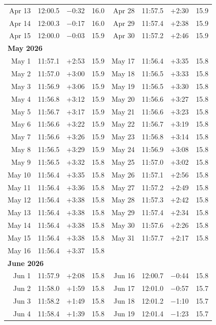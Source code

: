 {\begin{longtable}{r r r r | r r r r}
Apr 13 & 12:00.5 & $-$0:32 & 16.0 & Apr 28 & 11:57.5 & +2:30 & 15.9 \\
Apr 14 & 12:00.3 & $-$0:17 & 16.0 & Apr 29 & 11:57.4 & +2:38 & 15.9 \\
Apr 15 & 12:00.0 & $-$0:03 & 15.9 & Apr 30 & 11:57.2 & +2:46 & 15.9 \\
\multicolumn{8}{l}{\textbf{May 2026}}\\
May 1 & 11:57.1 & +2:53 & 15.9 & May 17 & 11:56.4 & +3:35 & 15.8 \\
May 2 & 11:57.0 & +3:00 & 15.9 & May 18 & 11:56.5 & +3:33 & 15.8 \\
May 3 & 11:56.9 & +3:06 & 15.9 & May 19 & 11:56.5 & +3:30 & 15.8 \\
May 4 & 11:56.8 & +3:12 & 15.9 & May 20 & 11:56.6 & +3:27 & 15.8 \\
May 5 & 11:56.7 & +3:17 & 15.9 & May 21 & 11:56.6 & +3:23 & 15.8 \\
May 6 & 11:56.6 & +3:22 & 15.9 & May 22 & 11:56.7 & +3:19 & 15.8 \\
May 7 & 11:56.6 & +3:26 & 15.9 & May 23 & 11:56.8 & +3:14 & 15.8 \\
May 8 & 11:56.5 & +3:29 & 15.9 & May 24 & 11:56.9 & +3:08 & 15.8 \\
May 9 & 11:56.5 & +3:32 & 15.8 & May 25 & 11:57.0 & +3:02 & 15.8 \\
May 10 & 11:56.4 & +3:35 & 15.8 & May 26 & 11:57.1 & +2:56 & 15.8 \\
May 11 & 11:56.4 & +3:36 & 15.8 & May 27 & 11:57.2 & +2:49 & 15.8 \\
May 12 & 11:56.4 & +3:38 & 15.8 & May 28 & 11:57.3 & +2:42 & 15.8 \\
May 13 & 11:56.4 & +3:38 & 15.8 & May 29 & 11:57.4 & +2:34 & 15.8 \\
May 14 & 11:56.4 & +3:38 & 15.8 & May 30 & 11:57.6 & +2:26 & 15.8 \\
May 15 & 11:56.4 & +3:38 & 15.8 & May 31 & 11:57.7 & +2:17 & 15.8 \\
May 16 & 11:56.4 & +3:37 & 15.8 &  & & &  \\
\multicolumn{8}{l}{\textbf{June 2026}}\\
Jun 1 & 11:57.9 & +2:08 & 15.8 & Jun 16 & 12:00.7 & $-$0:44 & 15.8 \\
Jun 2 & 11:58.0 & +1:59 & 15.8 & Jun 17 & 12:01.0 & $-$0:57 & 15.7 \\
Jun 3 & 11:58.2 & +1:49 & 15.8 & Jun 18 & 12:01.2 & $-$1:10 & 15.7 \\
Jun 4 & 11:58.4 & +1:39 & 15.8 & Jun 19 & 12:01.4 & $-$1:23 & 15.7 \\

\end{longtable}}
